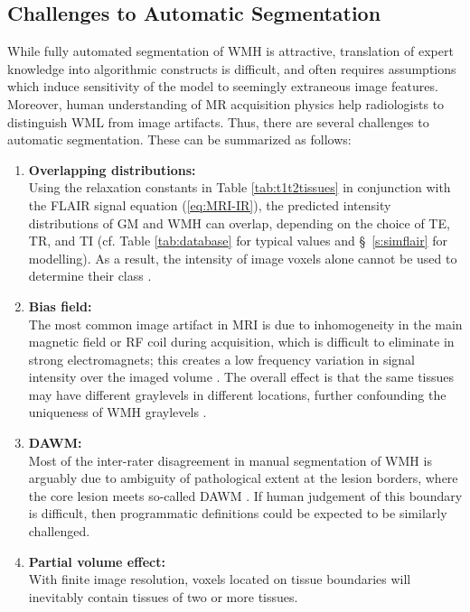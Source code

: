 \subsection{Challenges to Automatic Segmentation}\label{ss:autochallenges}
While fully automated segmentation of WMH is attractive, translation of expert knowledge into algorithmic constructs is difficult, and often requires assumptions which induce sensitivity of the model to seemingly extraneous image features.
Moreover, human understanding of MR acquisition physics help radiologists to distinguish WML from image artifacts.
Thus, there are several challenges to automatic segmentation.
These can be summarized as follows:
\begin{enumerate}[itemsep=0pt,topsep=0pt]
  \item \label{chauto:overlap}
  \textbf{Overlapping distributions:} \\
    Using the relaxation constants in Table \ref{tab:t1t2tissues} in conjunction with the FLAIR signal equation (\ref{eq:MRI-IR}), the predicted intensity distributions of GM and WMH can overlap, depending on the choice of TE, TR, and TI (cf. Table \ref{tab:database} for typical values and \S\ \ref{s:simflair} for modelling).
    As a result, the intensity of image voxels alone cannot be used to determine their class \cite{Mortazavi2012}.
  \item \label{chauto:bias}
  \textbf{Bias field:} \\
    The most common image artifact in MRI is due to inhomogeneity in the main magnetic field or RF coil during acquisition, which is difficult to eliminate in strong electromagnets; this creates a low frequency variation in signal intensity over the imaged volume \cite{Juntu2005,Vovk2007}.
    The overall effect is that the same tissues may have different graylevels in different locations, further confounding the uniqueness of WMH graylevels \cite{Wardlaw2015}.
  \item \label{chauto:dawm}
  \textbf{DAWM:} \\
    Most of the inter-rater disagreement in manual segmentation of WMH is arguably due to ambiguity of pathological extent at the lesion borders, where the core lesion meets so-called DAWM \cite{Ge2003}.
    If human judgement of this boundary is difficult, then programmatic definitions could be expected to be similarly challenged.
  \item \label{chauto:pva}
  \textbf{Partial volume effect:} \\
    With finite image resolution, voxels located on tissue boundaries will inevitably contain tissues of two or more tissues.

\end{enumerate}

